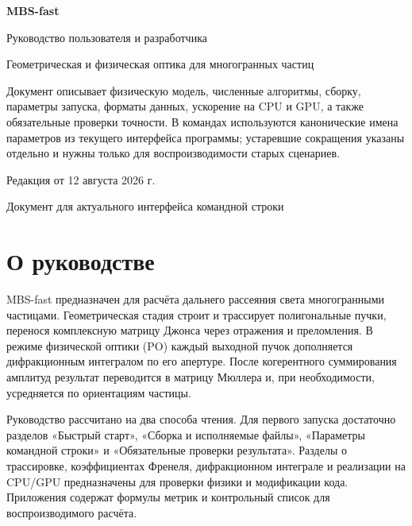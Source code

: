 \documentclass[11pt,a4paper]{article}
\begin{document}
\begin{titlepage}
  \thispagestyle{empty}
  \centering
  \vspace*{0.16\textheight}
  {\Huge\bfseries MBS-fast\par}
  \vspace{1.2em}
  {\LARGE Руководство пользователя и разработчика\par}
  \vspace{0.8em}
  {\large Геометрическая и физическая оптика для многогранных частиц\par}
  \vfill
  \begin{minipage}{0.76\textwidth}
    \small
    Документ описывает физическую модель, численные алгоритмы, сборку,
    параметры запуска, форматы данных, ускорение на CPU и GPU, а также
    обязательные проверки точности. В командах используются канонические имена
    параметров из текущего интерфейса программы; устаревшие сокращения указаны
    отдельно и нужны только для воспроизводимости старых сценариев.
  \end{minipage}
  \vfill
  {Редакция от 12 августа 2026 г.\par}
  \vspace{0.5em}
  {Документ для актуального интерфейса командной строки\par}
\end{titlepage}

\section*{О руководстве}

MBS-fast предназначен для расчёта дальнего рассеяния света многогранными
частицами. Геометрическая стадия строит и трассирует полигональные пучки,
перенося комплексную матрицу Джонса через отражения и преломления. В режиме
физической оптики (PO) каждый выходной пучок дополняется дифракционным интегралом
по его апертуре. После когерентного суммирования амплитуд результат переводится
в матрицу Мюллера и, при необходимости, усредняется по ориентациям частицы.

Руководство рассчитано на два способа чтения. Для первого запуска достаточно
разделов «Быстрый старт», «Сборка и исполняемые файлы», «Параметры командной
строки» и «Обязательные проверки результата». Разделы о трассировке,
коэффициентах Френеля,
дифракционном интеграле и реализации на CPU/GPU предназначены для проверки
физики и модификации кода. Приложения содержат формулы метрик и контрольный
список для воспроизводимого расчёта.
\end{document}
